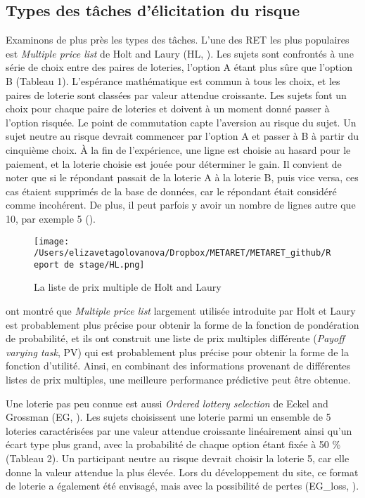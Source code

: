 \documentclass[12pt]{article}
\begin{document}
\subsection{Types des tâches d'élicitation du risque}

Examinons de plus près les types des tâches. L'une des RET les plus
populaires est \emph{Multiple price list} de Holt and Laury (HL,
\citet{Holt2002}). Les sujets sont confrontés à une série de choix entre
des paires de loteries, l'option A étant plus sûre que l'option B
(Tableau 1). L'espérance mathématique est commun à tous les choix, et
les paires de loterie sont classées par valeur attendue croissante. Les
sujets font un choix pour chaque paire de loteries et doivent à un
moment donné passer à l'option risquée. Le point de commutation capte
l'aversion au risque du sujet. Un sujet neutre au risque devrait
commencer par l'option A et passer à B à partir du cinquième choix. À la
fin de l'expérience, une ligne est choisie au hasard pour le paiement,
et la loterie choisie est jouée pour déterminer le gain. Il convient de
noter que si le répondant passait de la loterie A à la loterie B, puis
vice versa, ces cas étaient supprimés de la base de données, car le
répondant était considéré comme incohérent. De plus, il peut parfois y
avoir un nombre de lignes autre que 10, par exemple 5
(\citet{Branas_Garza2021}).

\begin{figure}
\centering
\texttt{[image: /Users/elizavetagolovanova/Dropbox/METARET/METARET\_github/Report de stage/HL.png]}
\caption{La liste de prix multiple de Holt and Laury}
\end{figure}

\citet{DrichoutisLusk2016} ont montré que \emph{Multiple price list}
largement utilisée introduite par Holt et Laury est probablement plus
précise pour obtenir la forme de la fonction de pondération de
probabilité, et ils ont construit une liste de prix multiples différente
(\emph{Payoff varying task}, PV) qui est probablement plus précise pour
obtenir la forme de la fonction d'utilité. Ainsi, en combinant des
informations provenant de différentes listes de prix multiples, une
meilleure performance prédictive peut être obtenue.

Une loterie pas peu connue est aussi \emph{Ordered lottery selection} de
Eckel and Grossman (EG, \citet{Eckel2002}). Les sujets choisissent une
loterie parmi un ensemble de 5 loteries caractérisées par une valeur
attendue croissante linéairement ainsi qu'un écart type plus grand, avec
la probabilité de chaque option étant fixée à 50 \% (Tableau 2). Un
participant neutre au risque devrait choisir la loterie 5, car elle
donne la valeur attendue la plus élevée. Lors du développement du site,
ce format de loterie a également été envisagé, mais avec la possibilité
de pertes (EG\_loss, \citet{Menkhoff_Sakha_2017}).
\end{document}
